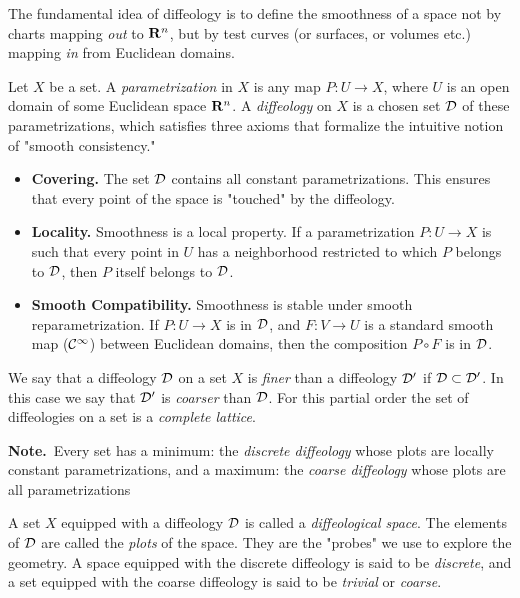 \documentclass[10pt,reqno,letterpaper,twoside]{amsbook}
\begin{document}
  The fundamental idea of diffeology is to define the smoothness of a space not by charts mapping \emph{out} to ${\mathbf{R}}^n$,
  but by test curves (or surfaces, or volumes etc.) mapping \emph{in} from Euclidean domains.
  
  Let $X$ be a set.
  A \emph{parametrization} in $X$ is any map $P: U \to X$,
  where $U$ is an open domain of some Euclidean space ${\mathbf{R}}^n$.
  A \emph{diffeology} on $X$ is a chosen set $\mathcal{D}$ of these parametrizations,
  which satisfies three axioms that formalize the intuitive notion of "smooth consistency."
  
  \begin{itemize}
    \item[D1.]\textbf{Covering.}
    The set $\mathcal{D}$ contains all constant parametrizations.
    This ensures that every point of the space is "touched" by the diffeology.
    \item[D2.] \textbf{Locality.}
    Smoothness is a local property.
    If a parametrization $P: U \to X$ is such that every point in $U$ has a neighborhood restricted to which $P$ belongs to $\mathcal{D}$,
    then $P$ itself belongs to $\mathcal{D}$.
    \item[D3.] \textbf{Smooth Compatibility.}
    Smoothness is stable under smooth re\-pa\-ra\-me\-tri\-za\-tion.
    If $P: U \to X$ is in $\mathcal{D}$,
    and $F: V \to U$ is a standard smooth map (${\mathcal{C}}^\infty$) between Euclidean domains,
    then the composition $P \circ F$ is in $\mathcal{D}$.
  \end{itemize}
  
  \begin{article}
    We say that a diffeology $\mathcal{D}$ on a set $X$ is \emph{finer} than a diffeology $\mathcal{D}'$ if $\mathcal{D} \subset \mathcal{D}'$.
    In this case we say that $\mathcal{D}'$ is \emph{coarser} than $\mathcal{D}$.
    For this partial order the set of diffeologies on a set is a \emph{complete lattice}.
    
    \textbf{Note.}~Every set has a minimum: the \emph{discrete diffeology} whose plots are locally constant parametrizations,
    and a maximum: the \emph{coarse diffeology} whose plots are all parametrizations
  \end{article}
  
  \begin{article}
    A set $X$ equipped with a diffeology $\mathcal{D}$ is called a \emph{diffeological space}.
    The elements of $\mathcal{D}$ are called the \emph{plots} of the space.
    They are the "probes" we use to explore the geometry.
    A space equipped with the discrete diffeology is said to be \emph{discrete},
    and a set equipped with the coarse diffeology is said to be \emph{trivial} or \emph{coarse}.
  \end{article}
  
\end{document}
